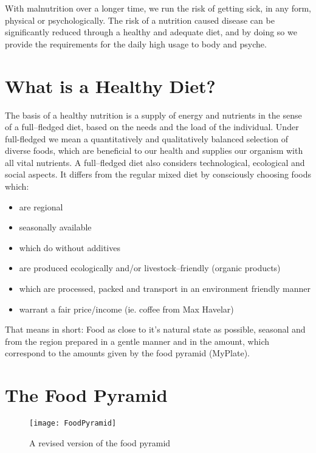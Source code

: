 \documentclass[../main.tex]{subfiles}
\begin{document}
With malnutrition over a longer time, we run the risk of getting sick, in any form, physical or psychologically.
The risk of a nutrition caused disease can be significantly reduced through a  healthy and adequate diet,
and by doing so we provide the requirements for the daily high usage to body and psyche.

\section{What is a Healthy Diet?}

The basis of a healthy nutrition is a supply of energy and nutrients in the sense of a full--fledged diet,
based on the needs and the load of the individual.
Under full-fledged we mean a quantitatively and qualitatively balanced selection of diverse foods,
which are beneficial to our health and supplies our organism with all vital nutrients.
A full--fledged diet also considers technological, ecological and social aspects.
It differs from the regular mixed diet by consciously choosing foods which:
\begin{itemize}
\item are regional
\item seasonally available
\item which do without additives
\item are produced ecologically and/or livestock--friendly (organic products)
\item which are processed, packed and transport in an environment friendly manner
  \item warrant a fair price/income (ie. coffee from Max Havelar)
  \end{itemize}

  That means in short: Food as close to it's natural state as possible, seasonal and from the region
  prepared in a gentle manner and in the amount, which correspond to the amounts given by the food pyramid (MyPlate).

  \section{The Food Pyramid}

  
\begin{figure}[htb!]
\centering
  \texttt{[image: FoodPyramid]}
  \caption{A revised version of the food pyramid~\cite{FoodPyramid}}
\end{figure}
\end{document}
